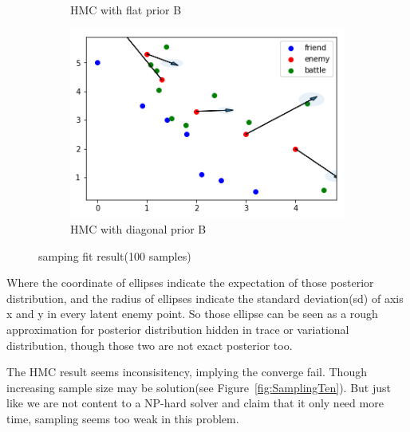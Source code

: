 \documentclass{article}
\begin{document}
\begin{figure}[h!]
\begin{subfigure}[b]{0.45\linewidth}
    \caption{HMC with flat prior B}
  \end{subfigure}
  \begin{subfigure}[b]{0.45\linewidth}
    \includegraphics[width=\linewidth]{Sampling22.png}
    \caption{HMC with diagonal prior B}
  \end{subfigure}
  \caption{samping fit result(100 samples)}
  \label{fig:samping}
\end{figure}

Where the coordinate of ellipses indicate the expectation of those posterior distribution,
and the radius of ellipses indicate the standard deviation(sd) of axis x and y in every latent enemy point.
So those ellipse can be seen as a rough approximation for posterior distribution 
hidden in trace or variational distribution, though those two are not exact posterior too.

The HMC result seems inconsisitency, implying the converge fail. Though increasing sample size may be
solution(see Figure~\ref{fig:SamplingTen}). But just like we are not content to a NP-hard solver and claim that it only need more time,
sampling seems too weak in this problem.
\end{document}
